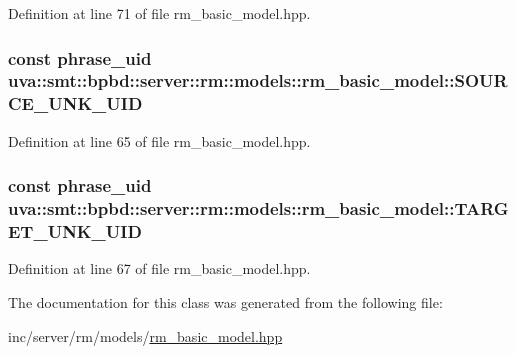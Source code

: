 Definition at line 71 of file rm\+\_\+basic\+\_\+model.\+hpp.

\hypertarget{classuva_1_1smt_1_1bpbd_1_1server_1_1rm_1_1models_1_1rm__basic__model_aba768b224f5e43c481f5e138a2414053}{}
\subsubsection[{S\+O\+U\+R\+C\+E\+\_\+\+U\+N\+K\+\_\+\+U\+I\+D}]{\setlength{\rightskip}{0pt plus 5cm}const {\bf phrase\+\_\+uid} uva\+::smt\+::bpbd\+::server\+::rm\+::models\+::rm\+\_\+basic\+\_\+model\+::\+S\+O\+U\+R\+C\+E\+\_\+\+U\+N\+K\+\_\+\+U\+I\+D}\label{classuva_1_1smt_1_1bpbd_1_1server_1_1rm_1_1models_1_1rm__basic__model_aba768b224f5e43c481f5e138a2414053}


Definition at line 65 of file rm\+\_\+basic\+\_\+model.\+hpp.

\hypertarget{classuva_1_1smt_1_1bpbd_1_1server_1_1rm_1_1models_1_1rm__basic__model_af11162881f5732c5ed1dd641a708d98c}{}
\subsubsection[{T\+A\+R\+G\+E\+T\+\_\+\+U\+N\+K\+\_\+\+U\+I\+D}]{\setlength{\rightskip}{0pt plus 5cm}const {\bf phrase\+\_\+uid} uva\+::smt\+::bpbd\+::server\+::rm\+::models\+::rm\+\_\+basic\+\_\+model\+::\+T\+A\+R\+G\+E\+T\+\_\+\+U\+N\+K\+\_\+\+U\+I\+D}\label{classuva_1_1smt_1_1bpbd_1_1server_1_1rm_1_1models_1_1rm__basic__model_af11162881f5732c5ed1dd641a708d98c}


Definition at line 67 of file rm\+\_\+basic\+\_\+model.\+hpp.



The documentation for this class was generated from the following file\+:\begin{DoxyCompactItemize}
\item 
inc/server/rm/models/\hyperlink{rm__basic__model_8hpp}{rm\+\_\+basic\+\_\+model.\+hpp}\end{DoxyCompactItemize}
